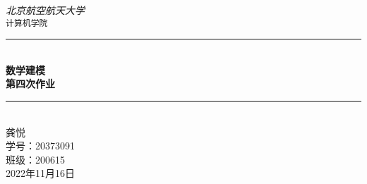 \documentclass[fontset=fandol]{ctexrep}
\newcommand{\artdate}{2022年11月16日}
\begin{document}
 
 \begin{titlepage}
 
     \newcommand{\HRule}{\rule{\linewidth}{0.5mm}}
   
     \vfill
     \center 
     
     \textit{\Large 北京航空航天大学}\\[0.5cm] 
     \texttt{\Large 计算机学院}
   
     \vspace{3 cm}
     \HRule \\[0.4cm]
     { \huge \bfseries 数学建模}\\[0.4cm]
     { \huge \bfseries 第四次作业}\\
     \HRule \\[1cm]
 
     \vspace{2.5 cm}
     龚悦\\
     学号：20373091\\
     班级：200615\\
 
     \vspace{1 cm}
     {\large \artdate}\\[3cm] 
   
   \vfill
   
 \end{titlepage}

 \tableofcontents
 
 \appendix
 
 
\end{document}
